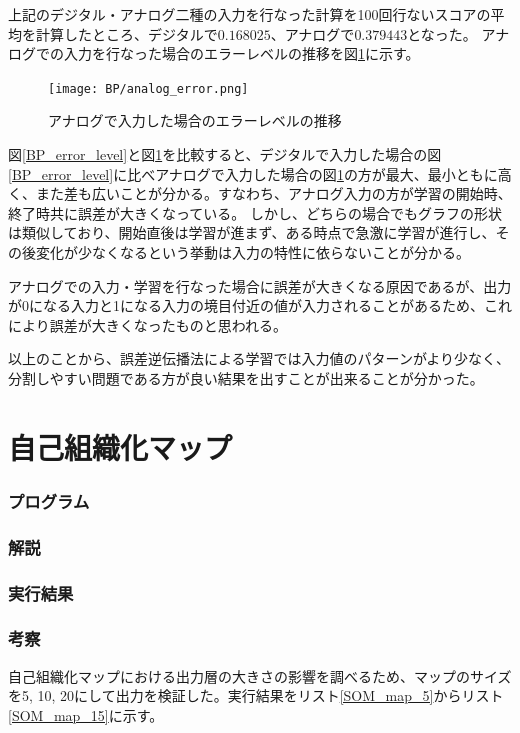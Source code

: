 \documentclass{jsarticle}
\begin{document}
上記のデジタル・アナログ二種の入力を行なった計算を100回行ないスコアの平均を計算したところ、デジタルで$0.168025$、アナログで$0.379443$となった。
アナログでの入力を行なった場合のエラーレベルの推移を図\ref{BP_analog_error}に示す。
\begin{figure}[H]
	\begin{center}
		\texttt{[image: BP/analog\_error.png]}
		\caption{アナログで入力した場合のエラーレベルの推移\label{BP_analog_error}}
	\end{center}
\end{figure}
図\ref{BP_error_level}と図\ref{BP_analog_error}を比較すると、デジタルで入力した場合の図\ref{BP_error_level}に比べアナログで入力した場合の図\ref{BP_analog_error}の方が最大、最小ともに高く、また差も広いことが分かる。すなわち、アナログ入力の方が学習の開始時、終了時共に誤差が大きくなっている。
しかし、どちらの場合でもグラフの形状は類似しており、開始直後は学習が進まず、ある時点で急激に学習が進行し、その後変化が少なくなるという挙動は入力の特性に依らないことが分かる。

アナログでの入力・学習を行なった場合に誤差が大きくなる原因であるが、出力が0になる入力と1になる入力の境目付近の値が入力されることがあるため、これにより誤差が大きくなったものと思われる。

以上のことから、誤差逆伝播法による学習では入力値のパターンがより少なく、分割しやすい問題である方が良い結果を出すことが出来ることが分かった。


\part{自己組織化マップ}
\section{プログラム}


\section{解説}


\section{実行結果}


\section{考察}
自己組織化マップにおける出力層の大きさの影響を調べるため、マップのサイズを5, 10, 20にして出力を検証した。実行結果をリスト\ref{SOM_map_5}からリスト\ref{SOM_map_15}に示す。
\end{document}
